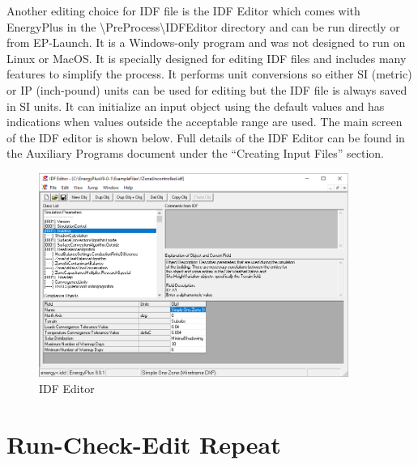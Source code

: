 Another editing choice for IDF file is the IDF Editor which comes
with EnergyPlus in the \textbackslash PreProcess\textbackslash IDFEditor
directory and can be run directly or from EP-Launch. It is a Windows-only
program and was not designed to run on Linux or MacOS. It is specially
designed for editing IDF files and includes many features to simplify
the process. It performs unit conversions so either SI (metric) or
IP (inch-pound) units can be used for editing but the IDF file is
always saved in SI units. It can initialize an input object using
the default values and has indications when values outside the acceptable
range are used. The main screen of the IDF editor is shown below.
Full details of the IDF Editor can be found in the Auxiliary Programs
document under the ``Creating Input Files'' section.

\begin{figure}[hbtp] 
\centering
\includegraphics[width=0.9\textwidth, height=0.9\textheight, keepaspectratio=true]{media/idfeditor.png}
\caption{IDF Editor}
\end{figure}

\section{Run-Check-Edit Repeat \label{subsec:Run-Check-Edit-Repeat}}

